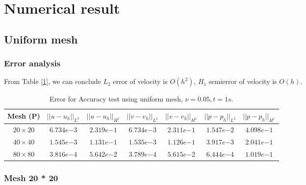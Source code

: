 \documentclass{article}
\begin{document}
\section{Numerical result}
\subsection{Uniform mesh}
\subsubsection{Error analysis}
From Table [\ref{tab::accuracy_uniform_error}], we can conclude $L_2$
error of velocity is $O(h^2)$, $H_1$ semierror of velocity is $O(h)$. 
\begin{table}[!htbp]
  \centering
  \begin{tabular}{ccccccc} \toprule
    Mesh (P)  & $||u - u_h ||_{L^2}$ & $||u - u_h ||_{H^1}$ & $||v -
    v_h||_{L^2}$ & $||v - v_h||_{H^1}$ & $||p - p_h||_{L^2}$ & $||p -
    p_h||_{H^1}$ \\ \midrule
    $20 \times 20$ &   $6.734 e{-3}$    & $2.319 e{-1}$ &
    $6.734 e{-3}$   &$2.311 e{-1}$   &   $1.547 
    e{-2}$ &   $4.098  e{-1}$ \\ \midrule
    $40 \times 40$   &   $1.545 e{-3}$   &   $1.131 e{-1}$  &
    $1.535   e{-3}$ & $1.126   e{-1}$ &
    $3.917   e{-3}$ & $2.041   e{-1}$ \\ \midrule
    $80 \times  80$ &   $3.816  e{-4}$   &   $5.642 
    e{-2} $ &  $3.789  e{-4}$ & $5.615  e{-2}$ &
    $6.444   e{-4}$ & $1.019  e{-1}$ \\ \bottomrule
  \end{tabular}
  \caption{\small Error for Accuracy test using uniform mesh, $\nu = 0.05, t = 1s$.}
  \label{tab::accuracy_uniform_error}
\end{table}

\subsubsection{Mesh 20 * 20}
\end{document}
